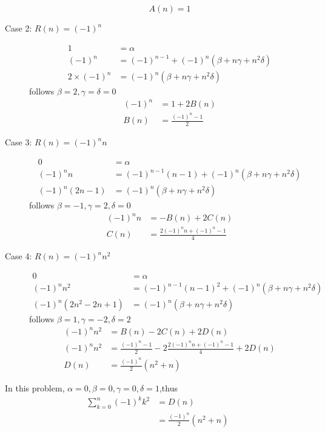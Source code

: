 \documentclass[a4paper,12pt]{article}
\makeatletter
\newtheorem*{solution}{Solution}
\theoremstyle{definition}
\renewenvironment{solution}[1][Solution] {\par\pushQED{\qed}\normalfont\topsep6\p@\@plus6\p@\relax\trivlist\item[\hskip\labelsep\bfseries#1\@addpunct{.}]\ignorespaces}{\popQED\endtrivlist\@endpefalse} \makeatother
\newenvironment{problems}{\begin{list}{}{\renewcommand{\makelabel}[1]{\textbf{##1}\hfil}}}{\end{list}}
\makeatother
\begin{document}
\begin{problems}
\begin{solution}
\begin{description}
            \begin{equation*}
                A(n)=1
            \end{equation*}
            \item[Case 2: $R(n)=(-1)^n$]
            \begin{align*}
                1&=\alpha\\
                (-1)^n&=(-1)^{n-1}+(-1)^n(\beta+n\gamma+n^2\delta)\\
                2\times(-1)^n&=(-1)^n(\beta+n\gamma+n^2\delta)
            \end{align*} 
            follows $\beta=2,\gamma=\delta=0$
            \begin{align*}
                (-1)^n&=1+2B(n)\\
                B(n)&=\frac{(-1)^n -1}{2}
            \end{align*}
            \item[Case 3: $R(n)=(-1)^nn$]
            \begin{align*}
                0&=\alpha\\
                (-1)^nn&=(-1)^{n-1}(n-1)+(-1)^n(\beta+n\gamma+n^2\delta)\\
                (-1)^n(2n-1)&=(-1)^n(\beta+n\gamma+n^2\delta)
            \end{align*}
            follows $\beta=-1,\gamma=2,\delta = 0$
            \begin{align*}
                (-1)^nn&=-B(n)+2C(n)\\
                C(n)&=\frac{2(-1)^nn+(-1)^n-1}{4}
            \end{align*}
            \item[Case 4: $R(n)=(-1)^nn^2$]
            \begin{align*}
                0&=\alpha\\
                (-1)^nn^2&=(-1)^{n-1}(n-1)^2+(-1)^n(\beta+n\gamma+n^2\delta)\\
                (-1)^n(2n^2-2n+1)&=(-1)^n(\beta+n\gamma+n^2\delta)
            \end{align*} 
            follows $\beta=1,\gamma=-2,\delta=2$
            \begin{align*}
                (-1)^nn^2&=B(n)-2C(n)+2D(n)\\
                (-1)^nn^2&=\frac{(-1)^n -1}{2}-2\frac{2(-1)^nn+(-1)^n-1}{4}+2D(n)\\
                D(n)&=\frac{(-1)^n}{2}(n^2+n)
            \end{align*}
        \end{description}
        In this problem, $\alpha=0,\beta=0,\gamma=0,\delta=1$,thus
        \begin{align*}
            \sum_{k=0}^n (-1)^kk^2
            &=D(n)\\
            &=\frac{(-1)^n}{2}(n^2+n)
        \end{align*}
    \end{solution}
\end{problems}
\end{document}

